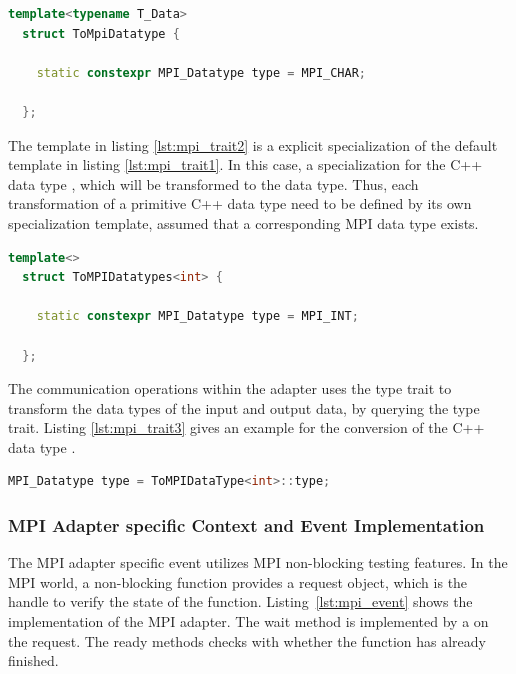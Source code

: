 \begin{lstlisting}[language=C++, label=lst:mpi_trait1]
  template<typename T_Data> 
  struct ToMpiDatatype { 

    static constexpr MPI_Datatype type = MPI_CHAR; 

  };
\end{lstlisting}

\noindent The template in listing \ref{lst:mpi_trait2} is a explicit
specialization of the default template in listing
\ref{lst:mpi_trait1}. In this case, a specialization for the C++ data
type , which will be transformed to the  data type.  Thus,
each transformation of a primitive C++ data type need to be defined
by its own specialization template, assumed that a corresponding
MPI data type exists.

\begin{lstlisting}[language=C++, label=lst:mpi_trait2]
  template<>
  struct ToMPIDatatypes<int> { 

    static constexpr MPI_Datatype type = MPI_INT; 

  };
\end{lstlisting}

The communication operations within the adapter uses the type trait to
transform the data types of the input and output data, by querying the
type trait. Listing \ref{lst:mpi_trait3} gives an example for the conversion 
of the C++ data type .

\begin{lstlisting}[language=C++, label=lst:mpi_trait3]
  MPI_Datatype type = ToMPIDataType<int>::type;
\end{lstlisting}

\subsubsection{MPI Adapter specific Context and Event Implementation}
The MPI adapter specific event utilizes MPI non-blocking testing
features. In the MPI world, a non-blocking function provides a request
object, which is the handle to verify the state of the
function. Listing~\ref{lst:mpi_event} shows the 
implementation of the MPI adapter.  The wait method is implemented by
a  on the request. The ready methods checks with
 whether the function has already finished.


